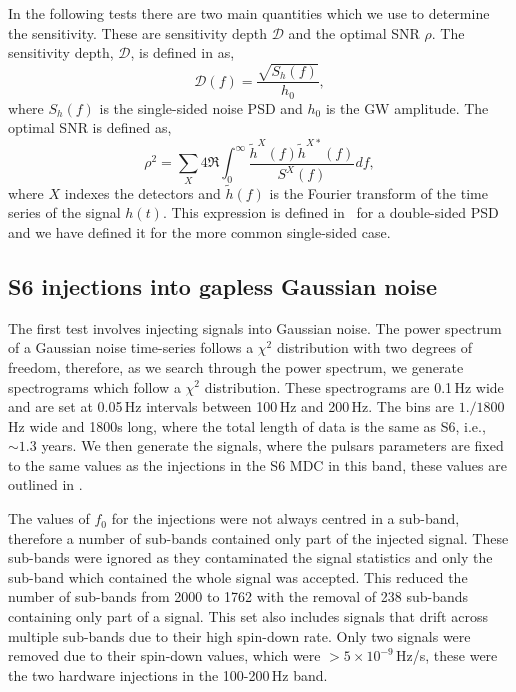 In the following tests there are two main quantities which we use to determine
the sensitivity. These are sensitivity depth $\mathcal{D}$ and the optimal
\ac{SNR} $\rho$.  The sensitivity depth, $\mathcal{D}$, is defined in
\citep{behnke2015PostprocessingMethods} as,
%
\begin{equation}
\label{sigmoid}
\mathcal{D}(f) = \frac{\sqrt{S_h(f)}}{h_0},
\end{equation}
%
where $S_h(f)$ is the single-sided noise \ac{PSD} and $h_0$ is the \ac{GW} amplitude.  The optimal \ac{SNR} is defined as,
%
\begin{equation}
\rho^2 = \sum_X 4
\Re\int^{\infty}_{0}\frac{\tilde{h}^X(f)\tilde{h}^{X*}(f)}{S^X(f)}df,
\end{equation}
%
 where $X$ indexes the
detectors and $\tilde{h}(f)$ is the Fourier transform of the time
series of the signal $h(t)$. This expression is defined in~\citep{prix2007SearchContinuous} for
a double-sided \ac{PSD} and we have defined it for the more common single-sided
case.

\subsection{\label{gaplessgauss}S6 injections into gapless Gaussian noise}
%
%
The first test involves injecting signals into Gaussian noise. The power spectrum of a Gaussian noise time-series follows a $\chi^2$ distribution with two degrees of freedom, therefore, as we search through the power spectrum, we generate spectrograms which follow a $\chi^2$ distribution. 
These spectrograms are 0.1\,Hz wide and are set at 0.05\,Hz intervals between 100\,Hz and 200\,Hz. The bins are $1./1800$\,Hz wide and 1800s long, where the total length of data is the same as S6, i.e., $\sim 1.3$ years.
We then generate the signals, where the pulsars parameters are
fixed to the same values as the injections in the S6 \ac{MDC} in this band, 
these values are outlined in \citep{walsh2016ComparisonMethods}.

%
%
The values of $f_0$ for the injections were not always centred in a
sub-band, therefore a number of sub-bands contained only part of the injected
signal. These sub-bands were ignored as they contaminated the signal statistics
and only the sub-band which contained the whole signal was accepted.  This
reduced the number of sub-bands from 2000 to 1762 with the removal of 238
sub-bands containing only part of a signal.
This set also includes signals that
drift across multiple sub-bands due to their high spin-down
rate. Only two signals were removed due to their spin-down values, which were $> 5 \times 10^{-9}$\,Hz/s, these were the two hardware injections in the 100-200\,Hz band.

